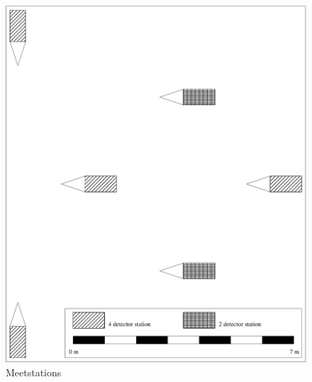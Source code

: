 \noindent \begin{center}
\begin{figure}[p]
\noindent \begin{centering}
\includegraphics[width=15.833cm]{Figures/station}
\par\end{centering}

\caption{\label{fig:Meetstations}Meetstations}
\end{figure}

\par\end{center}

